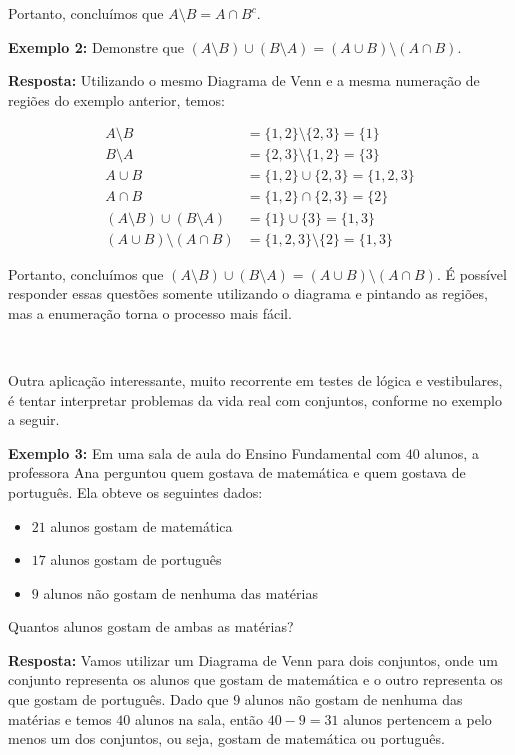   Portanto, concluímos que $A \setminus B = A \cap B^c$.
  
  \textbf{Exemplo 2:} Demonstre que $(A \setminus B) \cup (B \setminus A) = (A \cup B) \setminus (A \cap B)$.

  \textbf{Resposta:} Utilizando o mesmo Diagrama de Venn e a mesma numeração de regiões do exemplo anterior, temos:

  \begin{equation*}
    \begin{aligned}
      A \setminus B &= \{1,2\} \setminus \{2,3\} = \{1\}\\
      B \setminus A &= \{2,3\} \setminus \{1,2\} = \{3\}\\
      A \cup B &= \{1,2\} \cup \{2,3\} = \{1,2,3\}\\
      A \cap B &= \{1,2\} \cap \{2,3\} = \{2\}\\
      (A \setminus B) \cup (B \setminus A) &= \{1\} \cup \{3\} = \{1,3\}\\
      (A \cup B) \setminus (A \cap B) &= \{1,2,3\} \setminus \{2\} = \{1,3\}
    \end{aligned}
  \end{equation*}
  
  Portanto, concluímos que $(A \setminus B) \cup (B \setminus A) = (A \cup B) \setminus (A \cap B)$.
  \newline
  É possível responder essas questões somente utilizando o diagrama e pintando as regiões, mas a enumeração torna o processo mais fácil.
  
  $\qquad$

  Outra aplicação interessante, muito recorrente em testes de lógica e vestibulares, é tentar interpretar problemas da vida real com conjuntos, conforme no exemplo a seguir.

  \textbf{Exemplo 3:} Em uma sala de aula do Ensino Fundamental com $40$ alunos, a professora Ana perguntou quem gostava de matemática e quem gostava de português. Ela obteve os seguintes dados:

  \begin{itemize}
    \item $21$ alunos gostam de matemática
    \item $17$ alunos gostam de português
    \item $9$ alunos não gostam de nenhuma das matérias
  \end{itemize}

  Quantos alunos gostam de ambas as matérias?

  \textbf{Resposta:} Vamos utilizar um Diagrama de Venn para dois conjuntos, onde um conjunto representa os alunos que gostam de matemática e o outro representa os que gostam de português.
  Dado que $9$ alunos não gostam de nenhuma das matérias e temos $40$ alunos na sala, então $40-9=31$ alunos pertencem a pelo menos um dos conjuntos, ou seja, gostam de matemática ou português.

